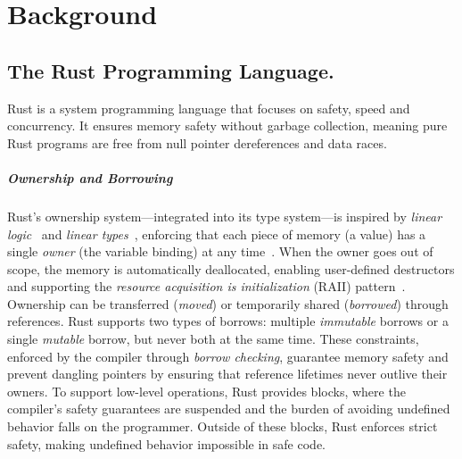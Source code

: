 \chapter{Background}\label{chap:background}


\section{The Rust Programming Language.}\label{sec:rust}
Rust is a system programming language that focuses on safety, speed and concurrency.
It ensures memory safety without garbage collection, meaning pure Rust programs are free from null pointer dereferences and data races.

\paragraph{Ownership and Borrowing}
Rust's ownership system—integrated into its type system—is inspired by \textit{linear logic}~\cite{Girard87, Girard95} and \textit{linear types}~\cite{Wadler90, Odersky92}, enforcing that each piece of memory (a value) has a single \textit{owner} (the variable binding) at any time~\cite{Clarke98, Boyapati02}.
When the owner goes out of scope, the memory is automatically deallocated, enabling user-defined destructors and supporting the \textit{resource acquisition is initialization} (RAII) pattern~\cite{Stroustrup94}.
Ownership can be transferred (\textit{moved}) or temporarily shared (\textit{borrowed}) through references.
Rust supports two types of borrows: multiple \textit{immutable} borrows or a single \textit{mutable} borrow, but never both at the same time.
These constraints, enforced by the compiler through \textit{borrow checking}, guarantee memory safety and prevent dangling pointers by ensuring that reference lifetimes never outlive their owners.
To support low-level operations, Rust provides  blocks, where the compiler's safety guarantees are suspended and the burden of avoiding undefined behavior falls on the programmer.
Outside of these blocks, Rust enforces strict safety, making undefined behavior impossible in safe code.

